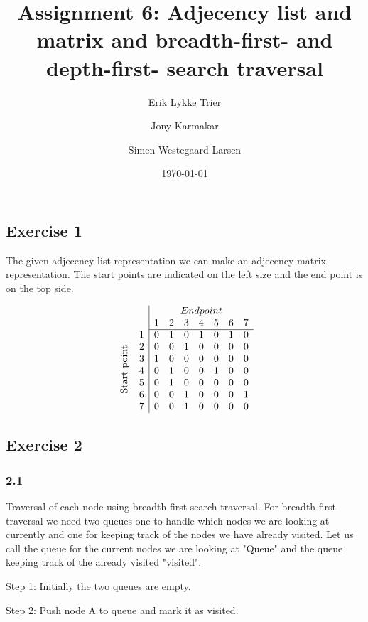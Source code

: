 \documentclass{article}
\title{Assignment 6: Adjecency list and matrix and breadth-first- and depth-first- search traversal}
\author{Erik Lykke Trier \and Jony Karmakar \and Simen Westegaard Larsen}
\date{\today}
\begin{document}
\maketitle
\subsection*{Exercise 1}
The given adjecency-list representation we can make an adjecency-matrix representation. The start points are indicated
on the left size and the end point is on the top side.

\[
\begin{array}{cc|ccccccc}
    & & \multicolumn{7}{c}{End point} \\
    & & 1 & 2 & 3 & 4 & 5 & 6 & 7 \\
\cline{3-9}
\multirow{7}{*}{\rotatebox{90}{Start point}} & 1 & 0 & 1 & 0 & 1 & 0 & 1 & 0 \\
    & 2 & 0 & 0 & 1 & 0 & 0 & 0 & 0 \\
    & 3 & 1 & 0 & 0 & 0 & 0 & 0 & 0 \\
    & 4 & 0 & 1 & 0 & 0 & 1 & 0 & 0 \\
    & 5 & 0 & 1 & 0 & 0 & 0 & 0 & 0 \\
    & 6 & 0 & 0 & 1 & 0 & 0 & 0 & 1 \\
    & 7 & 0 & 0 & 1 & 0 & 0 & 0 & 0 \\
\end{array}
\]


\subsection*{Exercise 2}
\subsubsection*{2.1}
Traversal of each node using breadth first search traversal. For breadth first traversal we need two queues one to handle which 
nodes we are looking at currently and one for keeping track of the nodes we have already visited. Let us call the queue for the 
current nodes we are looking at "Queue" and the queue keeping track of the already visited "visited". \newline

Step 1: Initially the two queues are empty.   \newline 

Step 2: Push node A to queue and mark it as visited. \newline   
\end{document}

